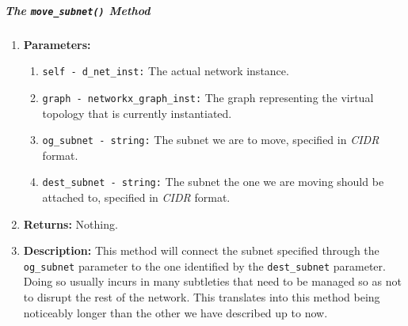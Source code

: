     \subparagraph{The \texttt{move\_subnet()} Method}
        \begin{enumerate}
            \item \textbf{Parameters:}
            \begin{enumerate}
                \item \texttt{self - d\_net\_inst:} The actual network instance.
                \item \texttt{graph - networkx\_graph\_inst:} The graph representing the virtual topology that is currently instantiated.
                \item \texttt{og\_subnet - string:} The subnet we are to move, specified in \textit{CIDR} format.
                \item \texttt{dest\_subnet - string:} The subnet the one we are moving should be attached to, specified in \textit{CIDR} format.
            \end{enumerate}
            \item \textbf{Returns:} Nothing.
            \item \textbf{Description:} This method will connect the subnet specified through the \texttt{og\_subnet} parameter to the one identified by the \texttt{dest\_subnet} parameter. Doing so usually incurs in many subtleties that need to be managed so as not to disrupt the rest of the network. This translates into this method being noticeably longer than the other we have described up to now.
        \end{enumerate}


